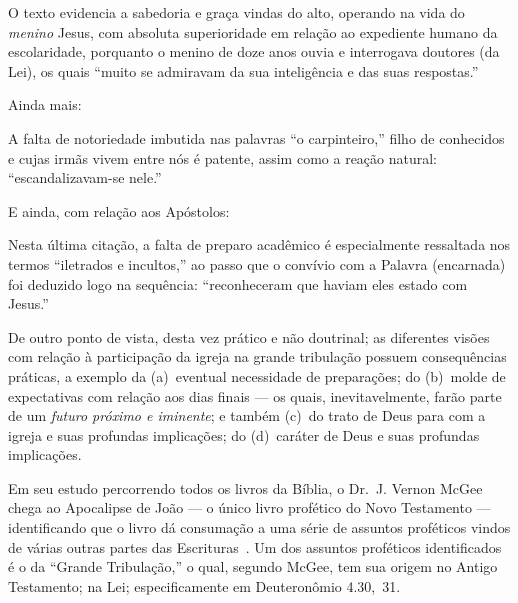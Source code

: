     O texto evidencia a sabedoria e graça vindas do alto, operando na vida do \emph{menino} Jesus, com absoluta superioridade em
    relação ao expediente humano da escolaridade, porquanto o menino de doze anos ouvia e  interrogava  doutores  (da  Lei),  os
    quais ``muito se admiravam da sua inteligência e das suas respostas.''

    Ainda mais:


    A falta de notoriedade imbutida nas palavras ``o carpinteiro,'' filho de conhecidos e cujas irmãs vivem entre nós é patente,
    assim como a reação natural: ``escandalizavam-se nele.''

    E ainda, com relação aos Apóstolos:


    Nesta última citação, a falta de preparo acadêmico é especialmente ressaltada nos termos ``iletrados e incultos,'' ao  passo
    que o convívio com a Palavra (encarnada) foi deduzido logo na sequência: ``reconheceram que haviam eles estado com Jesus.''




    De outro ponto de vista, desta vez prático e não doutrinal; as diferentes visões com relação à  participação  da  igreja  na
    grande tribulação possuem consequências práticas, a exemplo da (a)~eventual necessidade  de  preparações;  do  (b)~molde  de
    expectativas com relação aos dias finais --- os quais, inevitavelmente, farão parte de um \emph{futuro próximo e  iminente};
    e também (c)~do trato de Deus para com a igreja e suas profundas implicações;  do  (d)~caráter  de  Deus  e  suas  profundas
    implicações.

    Em seu estudo percorrendo todos os livros da Bíblia, o Dr.~J. Vernon McGee chega ao Apocalipse de João  ---  o  único  livro
    profético do Novo Testamento --- identificando que o livro dá consumação a uma série de assuntos proféticos vindos de várias
    outras partes das  Escrituras~\cite{ca1980-McGeeJV-49Rev}.  Um  dos  assuntos  proféticos  identificados  é  o  da  ``Grande
    Tribulação,'' o qual, segundo McGee, tem sua origem no Antigo Testamento; na Lei; especificamente em Deuteronômio 4.30,~31.

